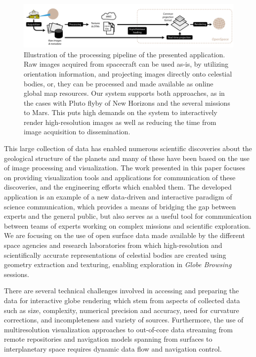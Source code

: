 \documentclass[journal]{vgtc}                %
\begin{document}
\begin{figure}
\includegraphics[width=\linewidth]{figures/overview.pdf}
\caption{Illustration of the processing pipeline of the presented application. Raw images acquired from spacecraft can be used as-is, by utilizing orientation information, and projecting images directly onto celestial bodies, or, they can be processed and made available as online global map resources. Our system supports both approaches, as in the cases with Pluto flyby of New Horizons and the several missions to Mars. This puts high demands on the system to interactively render high-resolution images as well as reducing the time from image acquisition to dissemination.}\vspace{-3mm}

\label{fig:procpipe}
\end{figure}

This large collection of data has enabled numerous scientific discoveries about the geological structure of the planets and many of these have been based on the use of image processing and visualization.
The work presented in this paper focuses on providing visualization tools and applications for communication of these discoveries, and the engineering efforts which enabled them.
The developed application is an example of a new data-driven and interactive paradigm of science communication, which provides a means of bridging the gap between experts and the general public, but also serves as a useful tool for communication between teams of experts working on complex missions and scientific exploration.
We are focusing on the use of open surface data made available by the different space agencies and research laboratories from which high-resolution and scientifically accurate representations of celestial bodies are created using geometry extraction and texturing, enabling exploration in \emph{Globe Browsing} sessions.

There are several technical challenges involved in accessing and preparing the data for interactive globe rendering which stem from aspects of collected data such as size, complexity, numerical precision and accuracy, need for curvature corrections, and incompleteness and variety of sources.
Furthermore, the use of multiresolution visualization approaches to out-of-core data streaming from remote repositories and navigation models spanning from surfaces to interplanetary space requires dynamic data flow and navigation control. 
\end{document}
